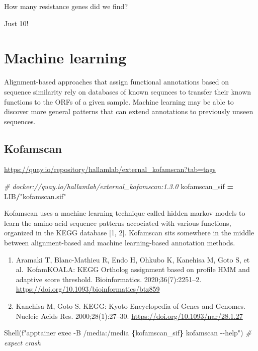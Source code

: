\documentclass[
]{book}
\newenvironment{Shaded}{\begin{snugshade}}{\end{snugshade}}
\newcommand{\CommentTok}[1]{\textcolor[rgb]{0.56,0.35,0.01}{\textit{#1}}}
\newcommand{\NormalTok}[1]{#1}
\newcommand{\OperatorTok}[1]{\textcolor[rgb]{0.81,0.36,0.00}{\textbf{#1}}}
\newcommand{\SpecialCharTok}[1]{\textcolor[rgb]{0.81,0.36,0.00}{\textbf{#1}}}
\newcommand{\SpecialStringTok}[1]{\textcolor[rgb]{0.31,0.60,0.02}{#1}}
\newcommand{\StringTok}[1]{\textcolor[rgb]{0.31,0.60,0.02}{#1}}
\providecommand{\tightlist}{%
  \setlength{\itemsep}{0pt}\setlength{\parskip}{0pt}}
\begin{document}
How many resistance genes did we find?

Just 10!

\section{Machine learning}\label{machine-learning}

Alignment-based approaches that assign functional annotations based on sequence similarity rely on databases of known sequnces
to transfer their known functions to the ORFs of a given sample. Machine learning may be able to discover more general patterns
that can extend annotations to previously unseen sequences.

\subsection{Kofamscan}\label{kofamscan}

\url{https://quay.io/repository/hallamlab/external_kofamscan?tab=tags}

\begin{Shaded}
\begin{Highlighting}[numbers=left,,]
\CommentTok{\# docker://quay.io/hallamlab/external\_kofamscan:1.3.0}
\NormalTok{kofamscan\_sif }\OperatorTok{=}\NormalTok{ LIB}\OperatorTok{/}\StringTok{"kofamscan.sif"}
\end{Highlighting}
\end{Shaded}

Kofamscan uses a machine learning technique called hidden markov models to learn the amino acid sequence patterns
accociated with various functions, organized in the KEGG database {[}1, 2{]}. Kofamscan sits somewhere in the middle
between alignment-based and machine learning-based annotation methods.

\begin{enumerate}
\def\labelenumi{\arabic{enumi}.}
\tightlist
\item
  Aramaki T, Blanc-Mathieu R, Endo H, Ohkubo K, Kanehisa M, Goto S, et al.~KofamKOALA: KEGG Ortholog assignment based on profile HMM and adaptive score threshold. Bioinformatics. 2020;36(7):2251--2. \url{https://doi.org/10.1093/bioinformatics/btz859}
\item
  Kanehisa M, Goto S. KEGG: Kyoto Encyclopedia of Genes and Genomes. Nucleic Acids Res. 2000;28(1):27--30. \url{https://doi.org/10.1093/nar/28.1.27}
\end{enumerate}

\begin{Shaded}
\begin{Highlighting}[numbers=left,,]
\NormalTok{Shell(}\SpecialStringTok{f"apptainer exec {-}B /media:/media }\SpecialCharTok{\{}\NormalTok{kofamscan\_sif}\SpecialCharTok{\}}\SpecialStringTok{ kofamscan {-}{-}help"}\NormalTok{) }\CommentTok{\# expect crash}
\end{Highlighting}
\end{Shaded}
\end{document}
